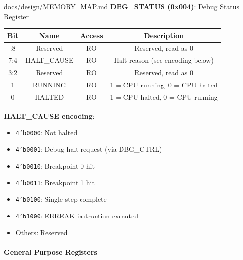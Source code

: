 \begin{relocated}{docs/design/MEMORY_MAP.md}
\textbf{DBG\_\allowbreak{}STATUS (0x004)}: Debug Status Register

{
\begin{longtable}[]{@{}cccc@{}}
\toprule\noalign{}
Bit & Name & Access & Description \\
\midrule\noalign{}
\endhead
\bottomrule\noalign{}
\endlastfoot
31:8 & Reserved & RO & Reserved, read as 0 \\
7:4 & HALT\_\allowbreak{}CAUSE & RO & Halt reason (see encoding
below) \\
3:2 & Reserved & RO & Reserved, read as 0 \\
1 & RUNNING & RO & 1 = CPU running, 0 = CPU halted \\
0 & HALTED & RO & 1 = CPU halted, 0 = CPU running \\
\end{longtable}
}

\textbf{HALT\_\allowbreak{}CAUSE encoding}:

\begin{itemize}
\tightlist
\item
  \texttt{4'b0000}: Not halted
\item
  \texttt{4'b0001}: Debug halt request (via DBG\_CTRL)
\item
  \texttt{4'b0010}: Breakpoint 0 hit
\item
  \texttt{4'b0011}: Breakpoint 1 hit
\item
  \texttt{4'b0100}: Single-step complete
\item
  \texttt{4'b1000}: EBREAK instruction executed
\item
  Others: Reserved
\end{itemize}

\paragraph{General Purpose Registers}\label{ds:mm:memory-map:general-purpose-registers}


\end{relocated}
